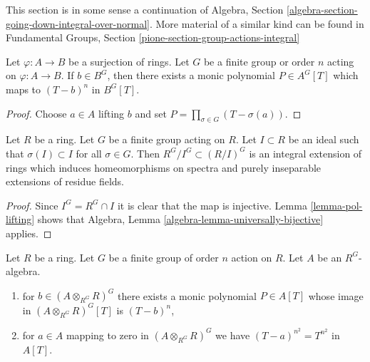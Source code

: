 \noindent
This section is in some sense a continuation of
Algebra, Section \ref{algebra-section-going-down-integral-over-normal}.
More material of a similar kind can be found in
Fundamental Groups, Section \ref{pione-section-group-actions-integral}

\begin{lemma}
\label{lemma-pol-lifting}
Let $\varphi : A \to B$ be a surjection of rings. Let $G$ be a finite group
or order $n$ acting on $\varphi : A \to B$. If $b \in B^G$, then
there exists a monic polynomial $P \in A^G[T]$ which maps to
$(T - b)^n$ in $B^G[T]$.
\end{lemma}

\begin{proof}
Choose $a \in A$ lifting $b$ and set
$P = \prod_{\sigma \in G} (T - \sigma(a))$.
\end{proof}

\begin{lemma}
\label{lemma-invariants-modulo}
Let $R$ be a ring. Let $G$ be a finite group acting on $R$. Let $I \subset R$
be an ideal such that $\sigma(I) \subset I$ for all $\sigma \in G$.
Then $R^G/I^G \subset (R/I)^G$ is an integral extension of rings which
induces homeomorphisms on spectra and purely inseparable extensions of
residue fields.
\end{lemma}

\begin{proof}
Since $I^G = R^G \cap I$ it is clear that the map is injective.
Lemma \ref{lemma-pol-lifting} shows that
Algebra, Lemma \ref{algebra-lemma-universally-bijective}
applies.
\end{proof}

\begin{lemma}
\label{lemma-functor-invariants-tensor}
Let $R$ be a ring. Let $G$ be a finite group of order $n$ action on $R$.
Let $A$ be an $R^G$-algebra.
\begin{enumerate}
\item for $b \in (A \otimes_{R^G} R)^G$ there exists a monic polynomial
$P \in A[T]$ whose image in $(A \otimes_{R^G} R)^G[T]$ is $(T - b)^n$,
\item for $a \in A$ mapping to zero in $(A \otimes_{R^G} R)^G$ we have
$(T - a)^{n^2} = T^{n^2}$ in $A[T]$.
\end{enumerate}
\end{lemma}

